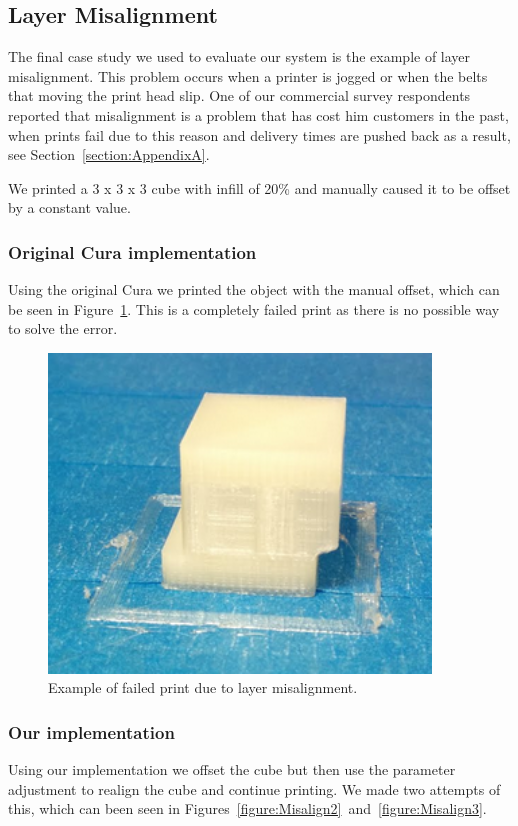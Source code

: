 \documentclass[11pt]{report} %
\begin{document}
\subsection{Layer Misalignment}
The final case study we used to evaluate our system is the example of layer misalignment. This problem occurs when a printer is jogged or when the belts that moving the print head slip. One of our commercial survey respondents reported that misalignment is a problem that has cost him customers in the past, when prints fail due to this reason and delivery times are pushed back as a result, see Section~\ref{section:AppendixA}.

We printed a 3 x 3 x 3 cube with infill of 20\% and manually caused it to be offset by a constant value.

\subsubsection{Original Cura implementation}
Using the original Cura we printed the object with the manual offset, which can be seen in Figure~\ref{figure:Misalign1}. This is a completely failed print as there is no possible way to solve the error. 

\begin{figure}[H]
  \centering
  \includegraphics[width=4in]{Misalign1.png}
  \caption{Example of failed print due to layer misalignment.}
  \label{figure:Misalign1}
\end{figure}

\subsubsection{Our implementation}
Using our implementation we offset the cube but then use the parameter adjustment to realign the cube and continue printing. We made two attempts of this, which can been seen in Figures~\ref{figure:Misalign2}~and~\ref{figure:Misalign3}.
\end{document}
